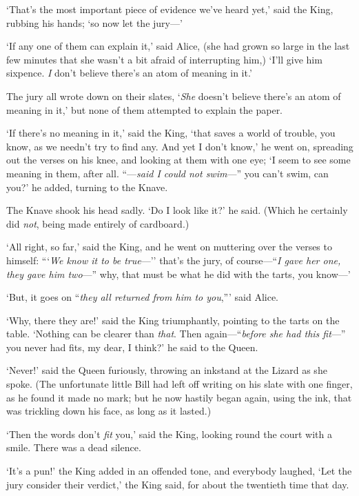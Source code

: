 \documentclass[12pt,openany]{memoir}
\begin{document}
`That's the most important piece of evidence we've heard yet,' said the King, rubbing his hands; `so now let the jury---'

`If any one of them can explain it,' said Alice, (she had grown so large in the last few minutes that she wasn't a bit afraid of interrupting him,) `I'll give him sixpence. \textit{I} don't believe there's an atom of meaning in it.'

The jury all wrote down on their slates, `\textit{She} doesn't believe there's an atom of meaning in it,' but none of them attempted to explain the paper.

`If there's no meaning in it,' said the King, `that saves a world of trouble, you know, as we needn't try to find any. And yet I don't know,' he went on, spreading out the verses on his knee, and looking at them with one eye; `I seem to see some meaning in them, after all. ``---\textit{said I could not swim}---'' you can't swim, can you?' he added, turning to the Knave.

The Knave shook his head sadly. `Do I look like it?' he said. (Which he certainly did \textit{not}, being made entirely of cardboard.)

`All right, so far,' said the King, and he went on muttering over the verses to himself: ```\textit{We know it to be true}---'' that's the jury, of course---``\textit{I gave her one, they gave him two}---'' why, that must be what he did with the tarts, you know---'

`But, it goes on ``\textit{they all returned from him to you},''' said Alice.

`Why, there they are!' said the King triumphantly, pointing to the tarts on the table. `Nothing can be clearer than \textit{that}. Then again---``\textit{before she had this fit}---'' you never had fits, my dear, I think?' he said to the Queen.

`Never!' said the Queen furiously, throwing an inkstand at the Lizard as she spoke. (The unfortunate little Bill had left off writing on his slate with one finger, as he found it made no mark; but he now hastily began again, using the ink, that was trickling down his face, as long as it lasted.)

`Then the words don't \textit{fit} you,' said the King, looking round the court with a smile. There was a dead silence.

`It's a pun!' the King added in an offended tone, and everybody laughed, `Let the jury consider their verdict,' the King said, for about the twentieth time that day.
\end{document}
